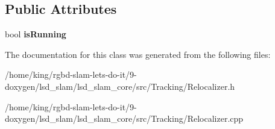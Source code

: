 \subsection*{Public Attributes}
\begin{DoxyCompactItemize}
\item 
\hypertarget{classlsd__slam_1_1_relocalizer_a771108ba996cd0bc8392e256b4060db3}{bool {\bfseries is\-Running}}\label{classlsd__slam_1_1_relocalizer_a771108ba996cd0bc8392e256b4060db3}

\end{DoxyCompactItemize}


The documentation for this class was generated from the following files\-:\begin{DoxyCompactItemize}
\item 
/home/king/rgbd-\/slam-\/lets-\/do-\/it/9-\/doxygen/lsd\-\_\-slam/lsd\-\_\-slam\-\_\-core/src/\-Tracking/Relocalizer.\-h\item 
/home/king/rgbd-\/slam-\/lets-\/do-\/it/9-\/doxygen/lsd\-\_\-slam/lsd\-\_\-slam\-\_\-core/src/\-Tracking/Relocalizer.\-cpp\end{DoxyCompactItemize}
